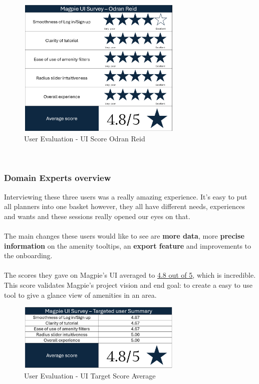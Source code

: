 \begin{figure}[h!]
    \centering
    \includegraphics[width=0.7\textwidth]{images/survey-odran.png}
    \caption{User Evaluation - UI Score Odran Reid}
\end{figure}\\

\newpage
\subsubsection{Domain Experts overview}
Interviewing these three users was a really amazing experience. It's easy to put all planners into one basket however, they all have different needs, experiences and wants and these sessions really opened our eyes on that.\\ \\
The main changes these users would like to see are \textbf{more data}, more \textbf{precise information} on the amenity tooltips, an \textbf{export feature} and improvements to the onboarding.\\ \\
The scores they gave on Magpie's UI averaged to \underline{4.8 out of 5}, which is incredible. This score validates Magpie's project vision and end goal: to create a easy to use tool to give a glance view of amenities in an area.
\begin{figure}[h!]
    \centering
    \includegraphics[width=0.7\textwidth]{images/survey-target-summary.png}
    \caption{User Evaluation - UI Target Score Average}
\end{figure}\\
